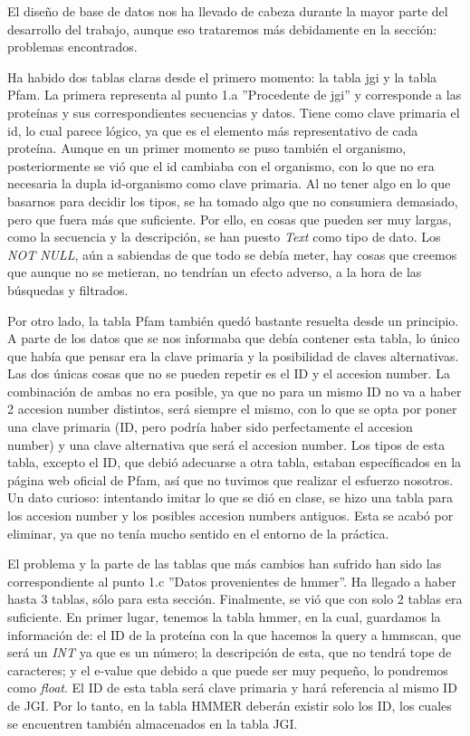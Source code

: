 \documentclass[11pt]{article} %
\begin{document}
El dise\~no de base de datos nos ha llevado de cabeza durante la mayor parte del desarrollo del trabajo, aunque eso trataremos m\'as debidamente en la secci\'on: problemas encontrados.

Ha habido dos tablas claras desde el primero momento: la tabla jgi y la tabla Pfam. La primera representa al punto 1.a ''Procedente de jgi'' y corresponde a las prote\'inas y sus correspondientes secuencias y datos. Tiene como clave primaria el id, lo cual parece l\'ogico, ya que es el elemento m\'as representativo de cada prote\'ina. Aunque en un primer momento se puso tambi\'en el organismo, posteriormente se vi\'o que el id cambiaba con el organismo, con lo que no era necesaria la dupla id-organismo como clave primaria. Al no tener algo en lo que basarnos para decidir los tipos, se ha tomado algo que no consumiera demasiado, pero que fuera m\'as que suficiente. Por ello, en cosas que pueden ser muy largas, como la secuencia y la descripci\'on, se han puesto \emph{Text} como tipo de dato. Los \emph{NOT NULL}, a\'un a sabiendas de que todo se deb\'ia meter, hay cosas que creemos que aunque no se metieran, no tendr\'ian un efecto adverso, a la hora de las b\'usquedas y filtrados.

Por otro lado, la tabla Pfam tambi\'en qued\'o bastante resuelta desde un principio. A parte de los datos que se nos informaba que deb\'ia contener esta tabla, lo \'unico que hab\'ia que pensar era la clave primaria y la posibilidad de claves alternativas. Las dos \'unicas cosas que no se pueden repetir es el ID y el accesion number. La combinaci\'on de ambas no era posible, ya que no para un mismo ID no va a haber 2 accesion number distintos, ser\'a siempre el mismo, con lo que se opta por poner una clave primaria (ID, pero podr\'ia haber sido perfectamente el accesion number) y una clave alternativa que ser\'a el accesion number. Los tipos de esta tabla, excepto el ID, que debi\'o adecuarse a otra tabla, estaban espec\'ificados en la p\'agina web oficial de Pfam, as\'i que no tuvimos que realizar el esfuerzo nosotros. Un dato curioso: intentando imitar lo que se di\'o en clase, se hizo una tabla para los accesion number y los posibles accesion numbers antiguos. Esta se acab\'o por eliminar, ya que no ten\'ia mucho sentido en el entorno de la pr\'actica.

El problema y la parte de las tablas que m\'as cambios han sufrido han sido las  correspondiente al punto 1.c ''Datos provenientes de hmmer''. Ha llegado a haber hasta 3 tablas, s\'olo para esta secci\'on. Finalmente, se vi\'o que con solo 2 tablas era suficiente. En primer lugar, tenemos la tabla hmmer, en la cual, guardamos la informaci\'on de: el ID de la prote\'ina con la que hacemos la query a hmmscan, que ser\'a un \emph{INT} ya que es un n\'umero; la descripci\'on de esta, que no tendr\'a  tope de caracteres; y el e-value que debido a que puede ser muy peque\~no, lo pondremos como \emph{float}. El ID de esta tabla ser\'a clave primaria y har\'a referencia al mismo ID de JGI. Por lo tanto, en la tabla HMMER deber\'an existir solo los ID, los cuales se encuentren tambi\'en almacenados en la tabla JGI. 
\end{document}
